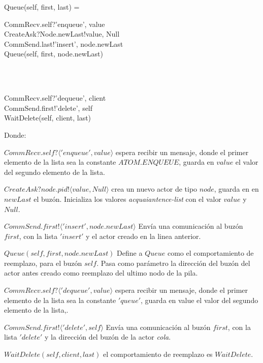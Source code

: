 \begin{process}
Queue(self, first, last) = \\ \quad
  \begin{block}
  CommRecv.self?\langle 'enqueue', value \rangle \then \\
  CreateAsk?Node.newLast!\langle value, Null \rangle \then \\
  CommSend.last!\langle 'insert', node.newLast \rangle \then \\
  Queue(self, first, node.newLast)
  \end{block} \\

  \Extchoice \\ \quad
  
  \begin{block}
  CommRecv.self?\langle 'dequeue', client \rangle \then \\
  CommSend.first!\langle 'delete', self \rangle \then \\
  WaitDelete(self, client, last)
  \end{block} 
\end{process}

Donde:

\begin{description}
 \item $CommRecv.self? \langle 'enqueue', value \rangle$ espera recibir un mensaje, donde el primer elemento de la lista sea la constante $ATOM.ENQUEUE$, guarda en $value$ el valor del segundo elemento de la lista.
 \item $CreateAsk?node.pid!\langle value, Null \rangle$ crea un nuevo actor de tipo $node$, guarda en en $newLast$ el buzón. Inicializa los valores \textit{acquaiantence-list} con el valor $value$ y $Null$.
 \item $CommSend.first!\langle 'insert', node.newLast \rangle$ Envía una comunicación al buzón $first$, con la lista $'insert'$ y el actor creado en la linea anterior. 
 \item $Queue(self, first, node.newLast)$ Define a $Queue$ como el comportamiento de reemplazo, para el buzón $self$. Pasa como parámetro la dirección del buzón del actor antes creado como reemplazo del ultimo nodo de la pila.
 \item $CommRecv.self?\langle 'dequeue', value \rangle$ espera recibir un mensaje, donde el primer elemento de la lista sea la constante $'queue'$, guarda en value el valor del segundo elemento de la lista,.
 \item $CommSend.first!\langle 'delete', self \rangle$ Envía una comunicación al buzón $first$, con la lista $'delete'$ y la dirección del buzón de la actor \textit{cola}. 
 \item $WaitDelete(self, client, last)$ el comportamiento de reemplazo es $WaitDelete$.
 \end{description}

